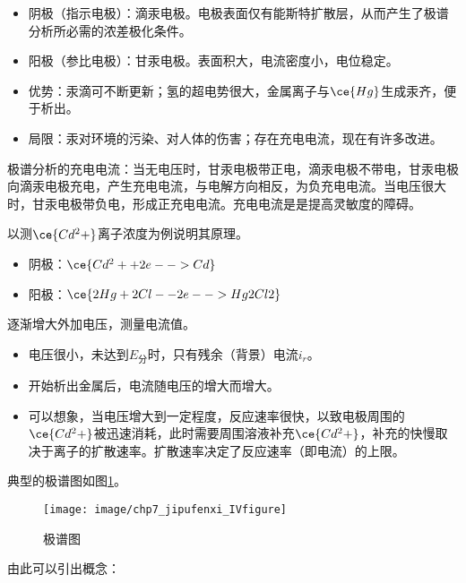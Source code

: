 \begin{itemize}
	\item 阴极（指示电极）：滴汞电极。电极表面仅有能斯特扩散层，从而产生了极谱分析所必需的浓差极化条件。
	\item 阳极（参比电极）：甘汞电极。表面积大，电流密度小，电位稳定。
	\item 优势：汞滴可不断更新；氢的超电势很大，金属离子与$\ce{Hg}$生成汞齐，便于析出。
	\item 局限：汞对环境的污染、对人体的伤害；存在充电电流，现在有许多改进。
\end{itemize}

\begin{note}
	极谱分析的充电电流：当无电压时，甘汞电极带正电，滴汞电极不带电，甘汞电极向滴汞电极充电，产生充电电流，与电解方向相反，为负充电电流。当电压很大时，甘汞电极带负电，形成正充电电流。充电电流是是提高灵敏度的障碍。
\end{note}

\begin{example}
	以测$\ce{Cd^2+}$离子浓度为例说明其原理。
	
	\begin{itemize}
		\item 阴极：$\ce{Cd^2+ + 2e- -> Cd}$
		\item 阳极：$\ce{2Hg + 2Cl- - 2e- -> Hg2Cl2}$
	\end{itemize}

	逐渐增大外加电压，测量电流值。
	
	\begin{itemize}
		\item 电压很小，未达到$E_{\text{分}}$时，只有残余（背景）电流$i_r$。
		\item 开始析出金属后，电流随电压的增大而增大。
		\item 可以想象，当电压增大到一定程度，反应速率很快，以致电极周围的$\ce{Cd^2+}$被迅速消耗，此时需要周围溶液补充$\ce{Cd^2+}$，补充的快慢取决于离子的扩散速率。扩散速率决定了反应速率（即电流）的上限。
	\end{itemize}

	典型的极谱图如图\ref{fig:chp7jipufenxiivfigure}。
\end{example}

\begin{figure}[!h]
	\centering
	\texttt{[image: image/chp7\_jipufenxi\_IVfigure]}
	\caption{极谱图}
	\label{fig:chp7jipufenxiivfigure}
\end{figure}

由此可以引出概念：

